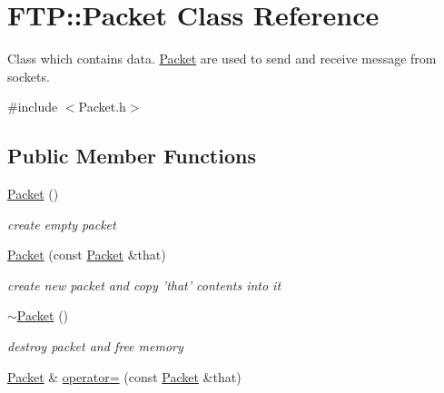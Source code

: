\hypertarget{class_f_t_p_1_1_packet}{\section{F\-T\-P\-:\-:Packet Class Reference}
\label{class_f_t_p_1_1_packet}
}


Class which contains data. \hyperlink{class_f_t_p_1_1_packet}{Packet} are used to send and receive message from sockets.  




{\ttfamily \#include $<$Packet.\-h$>$}

\subsection*{Public Member Functions}
\begin{DoxyCompactItemize}
\item 
\hypertarget{class_f_t_p_1_1_packet_a95e1b1075f22a60bca81da1740533595}{\hyperlink{class_f_t_p_1_1_packet_a95e1b1075f22a60bca81da1740533595}{Packet} ()}\label{class_f_t_p_1_1_packet_a95e1b1075f22a60bca81da1740533595}

\begin{DoxyCompactList}\small\item\em create empty packet \end{DoxyCompactList}\item 
\hypertarget{class_f_t_p_1_1_packet_aa027c8478b3aa7a964a1c5c7a2e57eba}{\hyperlink{class_f_t_p_1_1_packet_aa027c8478b3aa7a964a1c5c7a2e57eba}{Packet} (const \hyperlink{class_f_t_p_1_1_packet}{Packet} \&that)}\label{class_f_t_p_1_1_packet_aa027c8478b3aa7a964a1c5c7a2e57eba}

\begin{DoxyCompactList}\small\item\em create new packet and copy 'that' contents into it \end{DoxyCompactList}\item 
\hypertarget{class_f_t_p_1_1_packet_a0615f4be31088b859d770e6f620e357c}{\hyperlink{class_f_t_p_1_1_packet_a0615f4be31088b859d770e6f620e357c}{$\sim$\-Packet} ()}\label{class_f_t_p_1_1_packet_a0615f4be31088b859d770e6f620e357c}

\begin{DoxyCompactList}\small\item\em destroy packet and free memory \end{DoxyCompactList}\item 
\hypertarget{class_f_t_p_1_1_packet_a896fef76d79779c046dcd1918bc3ee68}{\hyperlink{class_f_t_p_1_1_packet}{Packet} \& \hyperlink{class_f_t_p_1_1_packet_a896fef76d79779c046dcd1918bc3ee68}{operator=} (const \hyperlink{class_f_t_p_1_1_packet}{Packet} \&that)}\label{class_f_t_p_1_1_packet_a896fef76d79779c046dcd1918bc3ee68}


\end{DoxyCompactItemize}
